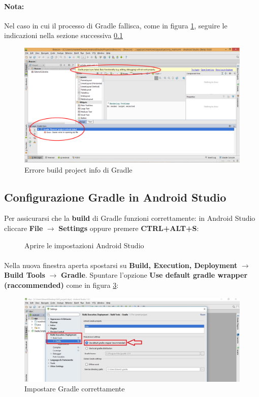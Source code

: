 \documentclass[../ManualeSviluppatore.tex]{subfiles}
\begin{document}
		\paragraph*{Nota:}
			Nel caso in cui il processo di Gradle fallisca, come in figura \ref{fig:GradleError}, seguire le indicazioni nella sezione successiva \ref{subsec:ConfigGradleAS}
			
		\begin{figure} [h]
			\centering
			\includegraphics[width=\textwidth]{img/GradleError}
			\caption{Errore build project info di Gradle}
			\label{fig:GradleError}
		\end{figure}
		
		\newpage
		\subsection{Configurazione Gradle in Android Studio}
		\label{subsec:ConfigGradleAS}
			Per assicurarsi che la \textbf{build} di Gradle funzioni correttamente: in Android Studio cliccare \textbf{File} $\rightarrow$ \textbf{Settings} oppure premere \textbf{CTRL+ALT+S}:
			
		
		\begin{figure} [h]
			\centering
			\caption{Aprire le impostazioni Android Studio}
			\label{fig:Settings}
		\end{figure}
		
		\paragraph*{}
			Nella nuova finestra aperta spostarsi su \textbf{Build, Execution, Deployment} $\rightarrow$ \textbf{Build Tools} $\rightarrow$ \textbf{Gradle}. Spuntare l'opzione \textbf{Use default gradle wrapper (raccommended)} come in figura \ref{fig:SetGradle}:
			
			\begin{figure} [h]
				\centering
				\includegraphics[width=\textwidth]{img/SetGradle}
				\caption{Impostare Gradle correttamente}
				\label{fig:SetGradle}
			\end{figure}
		
\end{document}
